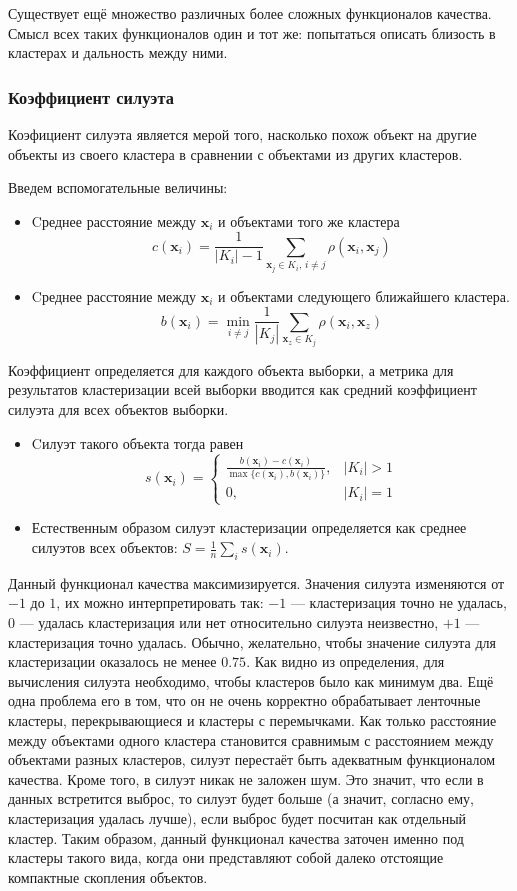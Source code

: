 \documentclass[10pt]{article}
\begin{document}
Существует ещё множество различных более сложных функционалов качества. Смысл всех таких функционалов один и тот же: попытаться описать близость в кластерах и дальность между ними.
\subsubsection{Коэффициент силуэта}
Коэфициент силуэта является мерой того, насколько похож объект на другие объекты из своего кластера в сравнении с объектами из других кластеров.

Введем вспомогательные величины:
\begin{itemize}
	\item Cреднее расстояние между $\pmb x_i$ и объектами того же кластера $$ c(\pmb x_i) = \frac{1}{|K_i| - 1}\sum\limits_{\pmb x_j \in K_i,\, i\neq j}\rho(\pmb x_i, \pmb x_j) $$ 
	\item Cреднее расстояние между $\pmb x_i$ и объектами следующего ближайшего кластера. $$ b(\pmb x_i) = \min\limits_{i\neq j}\frac{1}{|K_j|}\sum\limits_{\pmb x_z \in K_j}\rho(\pmb x_i, \pmb x_z) $$ 
\end{itemize}

Коэффициент определяется для каждого объекта выборки, а метрика для результатов кластеризации всей выборки вводится как средний коэффициент силуэта для всех объектов выборки.
\begin{itemize}
	\item Cилуэт такого объекта тогда равен  $$ s(\pmb x_i) = \begin{cases} \frac{b(\pmb x_i) - c(\pmb x_i)}{\max\{c(\pmb x_i), b(\pmb x_i)\}}, & |K_i| > 1\\ 0, & |K_i| = 1 \end{cases} $$ 
	\item Естественным образом силуэт кластеризации определяется как среднее силуэтов всех объектов: $S =\frac{1}{n}\sum\limits_{i}s(\pmb x_i)$. 
\end{itemize}
Данный функционал качества максимизируется. Значения силуэта изменяются от $-1$ до $1$, их можно интерпретировать так: $-1$ --- кластеризация
точно не удалась, $0$ --- удалась кластеризация или нет относительно силуэта неизвестно, $+1$ --- кластеризация точно удалась. Обычно, желательно, чтобы значение силуэта
для кластеризации оказалось не менее $0.75$. Как видно из определения, для вычисления силуэта необходимо, чтобы кластеров было как минимум два. Ещё одна проблема его в том, что он не очень корректно обрабатывает ленточные кластеры, перекрывающиеся и кластеры с перемычками. Как только расстояние между объектами одного кластера становится сравнимым с расстоянием между объектами разных кластеров, силуэт перестаёт быть адекватным функционалом качества. Кроме того, в силуэт никак не заложен шум. Это значит, что если в данных встретится выброс, то силуэт будет больше (а значит, согласно ему, кластеризация удалась лучше), если выброс будет посчитан как отдельный кластер. Таким образом, данный функционал качества заточен именно под кластеры такого вида, когда они представляют собой далеко отстоящие компактные скопления объектов.
\end{document}

